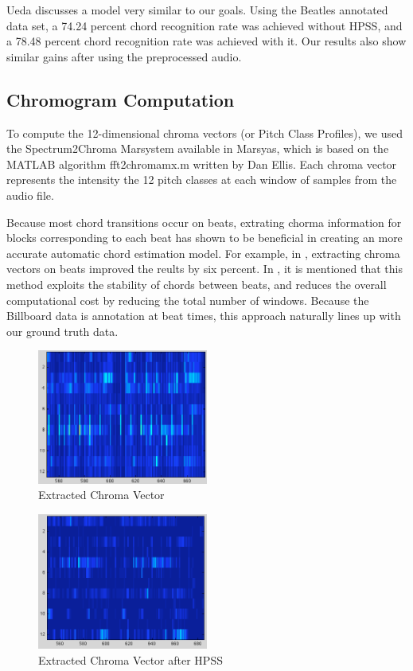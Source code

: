 \documentclass{article}
\begin{document}
Ueda \cite{Ueda:19} discusses a model very similar to our goals. Using the
Beatles annotated data set, a 74.24 percent chord recognition rate was achieved
without HPSS, and a 78.48 percent chord recognition rate was achieved with it.
Our results also show similar gains after using the preprocessed audio.

\subsection{Chromogram Computation}

To compute the 12-dimensional chroma vectors (or Pitch Class Profiles), we used
the Spectrum2Chroma Marsystem available in Marsyas, which is based on the
MATLAB algorithm fft2chromamx.m written by Dan Ellis.  Each chroma vector
represents the intensity the 12 pitch classes at each window of samples from
the audio file.

Because most chord transitions occur on beats, extrating chorma information for
blocks corresponding to each beat has shown to be beneficial in creating an
more accurate automatic chord estimation model. For example, in \cite{Zenz:20},
extracting chroma vectors on beats improved the reults by six percent. In
\cite{McVicor:00}, it is mentioned that this method exploits the stability of
chords between beats, and reduces the overall computational cost by reducing
the total number of windows. Because the Billboard data is annotation at beat
times, this approach naturally lines up with our ground truth data.

\begin{figure}
	\centering
	\includegraphics[width=0.5\textwidth]{187.png}
	\caption{Extracted Chroma Vector}
	\label{fig:ChromaNorm}
\end{figure}

\begin{figure}
	\centering
	\includegraphics[width=0.5\textwidth]{187h.png}
	\caption{Extracted Chroma Vector after HPSS}
	\label{fig:ChromaHPSS}
\end{figure}
\end{document}
